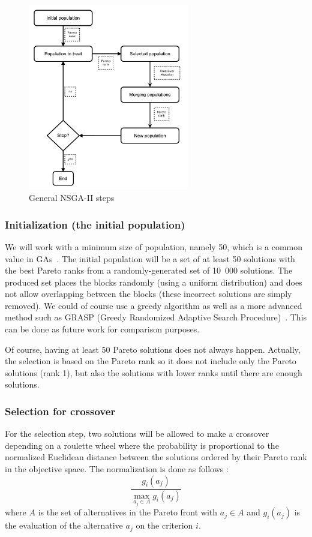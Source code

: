 \begin{figure}[h!]
\begin{center}
\includegraphics[width=7cm]{GA_dia_en.pdf}
\end{center}
\vspace{-0.5cm}
\caption{General NSGA-II steps}
\begin{center}
\end{center}
\label{fig:ga_steps}
\end{figure}

\subsubsection*{Initialization (the initial population)}
We will work with a minimum size of population, namely 50, which is a common value in GAs~\cite{Davis1989}. The initial population will be a set of at least 50 solutions with the best Pareto ranks from a randomly-generated set of 10~000 solutions. The produced set places the blocks randomly (using a uniform distribution) and does not allow overlapping between the blocks (these incorrect solutions are simply removed). We could of course use a greedy algorithm as well as a more advanced method such as GRASP (Greedy Randomized Adaptive Search Procedure)~\cite{HarSho87a}. This can be done as future work for comparison purposes.

Of course, having at least 50 Pareto solutions does not always happen. Actually, the selection is based on the Pareto rank so it does not include only the Pareto solutions (rank 1), but also the solutions with lower ranks until there are enough solutions.

\subsubsection*{Selection for crossover}
For the selection step, two solutions will be allowed to make a crossover depending on a roulette wheel where the probability is proportional to the normalized Euclidean distance between the solutions ordered by their Pareto rank in the objective space. The normalization is done as follows :
\begin{equation}
\frac{g_i(a_j)}{\max\limits_{a_j \in A} g_i(a_j)}
\end{equation}
where $A$ is the set of alternatives in the Pareto front with $a_j \in A$ and $g_i(a_j)$ is the evaluation of the alternative $a_j$ on the criterion $i$.

